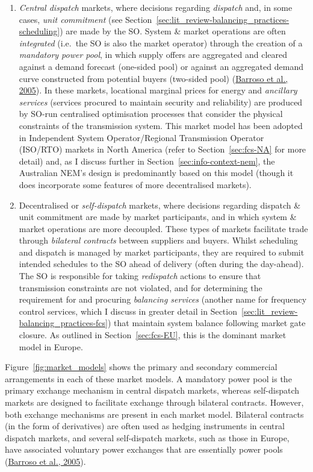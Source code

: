 \documentclass[12pt,a4paper,]{report}
\begin{document}
\begin{enumerate}
\def\labelenumi{\arabic{enumi}.}
\item
  \emph{Central dispatch} markets, where decisions regarding
  \emph{dispatch} and, in some cases, \emph{unit commitment} (see
  Section~\ref{sec:lit_review-balancing_practices-scheduling}) are made
  by the SO. System \& market operations are often \emph{integrated}
  (i.e.~the SO is also the market operator) through the creation of a
  \emph{mandatory power pool}, in which supply offers are aggregated and
  cleared against a demand forecast (one-sided pool) or against an
  aggregated demand curve constructed from potential buyers (two-sided
  pool)
  (\protect\hyperlink{ref-barrosoClassificationElectricityMarket2005}{Barroso
  et al., 2005}). In these markets, locational marginal prices for
  energy and \emph{ancillary services} (services procured to maintain
  security and reliability) are produced by SO-run centralised
  optimisation processes that consider the physical constraints of the
  transmission system. This market model has been adopted in Independent
  System Operator/Regional Transmission Operator (ISO/RTO) markets in
  North America (refer to Section~\ref{sec:fcs-NA} for more detail) and,
  as I discuss further in Section~\ref{sec:info-context-nem}, the
  Australian NEM's design is predominantly based on this model (though
  it does incorporate some features of more decentralised markets).
\item
  Decentralised or \emph{self-dispatch} markets, where decisions
  regarding dispatch \& unit commitment are made by market participants,
  and in which system \& market operations are more decoupled. These
  types of markets facilitate trade through \emph{bilateral contracts}
  between suppliers and buyers. Whilst scheduling and dispatch is
  managed by market participants, they are required to submit intended
  schedules to the SO ahead of delivery (often during the day-ahead).
  The SO is responsible for taking \emph{redispatch} actions to ensure
  that transmission constraints are not violated, and for determining
  the requirement for and procuring \emph{balancing services} (another
  name for frequency control services, which I discuss in greater detail
  in Section~\ref{sec:lit_review-balancing_practices-fcs}) that maintain
  system balance following market gate closure. As outlined in
  Section~\ref{sec:fcs-EU}, this is the dominant market model in Europe.
\end{enumerate}

Figure~\ref{fig:market_models} shows the primary and secondary
commercial arrangements in each of these market models. A mandatory
power pool is the primary exchange mechanism in central dispatch
markets, whereas self-dispatch markets are designed to facilitate
exchange through bilateral contracts. However, both exchange mechanisms
are present in each market model. Bilateral contracts (in the form of
derivatives) are often used as hedging instruments in central dispatch
markets, and several self-dispatch markets, such as those in Europe,
have associated voluntary power exchanges that are essentially power
pools
(\protect\hyperlink{ref-barrosoClassificationElectricityMarket2005}{Barroso
et al., 2005}).
\end{document}
